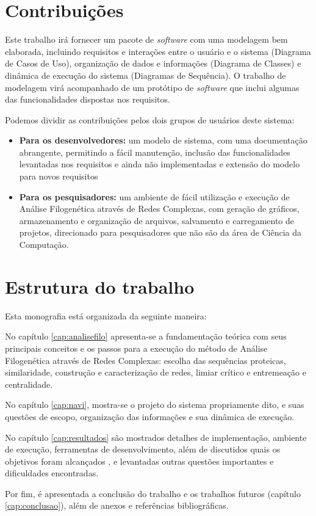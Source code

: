 \section{Contribuições}

Este trabalho irá fornecer um pacote de \textit{software} com uma modelagem bem elaborada, incluindo requisitos e interações entre o usuário
e o sistema (Diagrama de Casos de Uso), organização de dados e informações (Diagrama de Classes) e dinâmica de execução do sistema (Diagramas de Sequência).
O trabalho de modelagem virá acompanhado de um protótipo de \textit{software} que inclui algumas das funcionalidades dispostas nos requisitos.

Podemos dividir as contribuições pelos dois grupos de usuários deste sistema:

\begin{itemize}
  \item{\textbf{Para os desenvolvedores:} um modelo de sistema, com uma documentação abrangente, permitindo a fácil
manutenção, inclusão das funcionalidades levantadas nos requisitos e ainda não implementadas e extensão do modelo para novos requisitos}
  \item{\textbf{Para os pesquisadores:} um ambiente de fácil utilização e execução de Análise Filogenética através de Redes Complexas, com
geração de gráficos, armazenamento e organização de arquivos, salvamento e carregamento de projetos, direcionado para pesquisadores
que não são da área de Ciência da Computação.}
\end{itemize}


\section{Estrutura do trabalho}

Esta monografia está organizada da seguinte maneira:

No capítulo \ref{cap:analisefilo} apresenta-se a fundamentação teórica com seus principais conceitos
e os passos para a execução do método de Análise Filogenética através de Redes Complexas: escolha das sequências proteicas,
similaridade, construção e caracterização de redes, limiar crítico e entremeação e centralidade.

No capítulo \ref{cap:navi}, mostra-se o projeto do sistema propriamente dito, e suas questões
de escopo, organização das informações e sua dinâmica de execução.

No capítulo \ref{cap:resultados} são mostrados detalhes de implementação, ambiente de execução, ferramentas de
desenvolvimento, além de discutidos quais os objetivos foram alcançados , e levantadas
outras questões importantes e dificuldades encontradas.

Por fim, é apresentada a conclusão do trabalho e os trabalhos futuros (capítulo \ref{cap:conclusao}), além de anexos e referências bibliográficas.





